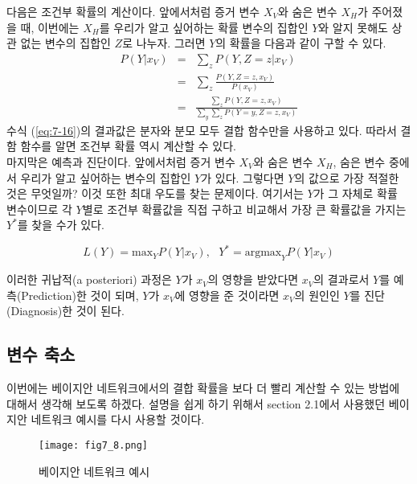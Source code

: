 \documentclass[a4paper]{oblivoir}
\begin{document}
다음은 조건부 확률의 계산이다. 앞에서처럼 증거 변수 $X_V$와 숨은 변수 $X_H$가 주어졌을 때, 이번에는 $X_H$를 우리가 알고 싶어하는 확률 변수의 집합인 $Y$와 알지 못해도 상관 없는 변수의 집합인 $Z$로 나누자. 그러면 $Y$의 확률을 다음과 같이 구할 수 있다. 
\begin{eqnarray}
P(Y|x_V) & = & \sum_{z} P(Y,Z=z|x_V) \nonumber \\
& = & \sum_{z} \frac{P(Y,Z=z,x_V)}{P(x_V)} \nonumber \\
& = & \frac{\sum_{z} P(Y,Z=z,x_V)}{\sum_{y} \sum_{z} P(Y=y,Z=z,x_V)} \label{eq:7-16}
\end{eqnarray}
수식 (\ref{eq:7-16})의 결과값은 분자와 분모 모두 결합 함수만을 사용하고 있다. 따라서 결함 함수를 알면 조건부 확률 역시 계산할 수 있다. \\

마지막은 예측과 진단이다. 앞에서처럼 증거 변수 $X_V$와 숨은 변수 $X_H$, 숨은 변수 중에서 우리가 알고 싶어하는 변수의 집합인 $Y$가 있다. 그렇다면 $Y$의 값으로 가장 적절한 것은 무엇일까? 이것 또한 최대 우도를 찾는 문제이다. 여기서는 $Y$가 그 자체로 확률 변수이므로 각 $Y$별로 조건부 확률값을 직접 구하고 비교해서 가장 큰 확률값을 가지는 $Y^*$를 찾을 수가 있다. 

\begin{equation}
L(Y) = \textrm{max}_{Y} P(Y|x_V), \ \ \ Y^* = \textrm{argmax}_{Y} P(Y|x_V)
\label{eq:7-17}
\end{equation}

이러한 귀납적(a posteriori) 과정은 $Y$가 $x_V$의 영향을 받았다면 $x_V$의 결과로서 $Y$를 예측(Prediction)한 것이 되며, $Y$가 $x_V$에 영향을 준 것이라면 $x_V$의 원인인 $Y$를 진단(Diagnosis)한 것이 된다.


\subsection{변수 축소}

이번에는 베이지안 네트워크에서의 결합 확률을 보다 더 빨리 계산할 수 있는 방법에 대해서 생각해 보도록 하겠다. 설명을 쉽게 하기 위해서 section 2.1에서 사용했던 베이지안 네트워크 예시를 다시 사용할 것이다. \\  

\begin{figure}[ht] \centering 
\texttt{[image: fig7\_8.png]} 
\caption{베이지안 네트워크 예시}
\label{fig:7-17}
\end{figure} 
\end{document}
